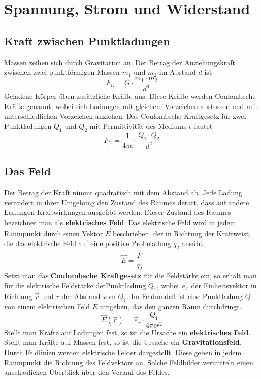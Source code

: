 \section{Spannung, Strom und Widerstand}
\subsection{Kraft zwischen Punktladungen}
Massen zeihen sich durch Gravitation an. Der Betrag der Anziehungskraft zwischen zwei punktförmigen Massen $m_1$ und $m_2$ im Abstand $d$ ist
\begin{equation}
\boxed{F_G=G\cdot \dfrac{m_1\cdot m_2}{d^3}}
\end{equation}
Geladene Körper üben zusätzliche Kräfte aus. Diese Kräfte werden Coulombsche Kräfte genannt, wobei sich Ladungen mit gleichem Vorzeichen abstossen und mit unterschiedlichen Vorzeichen anziehen.
\newline\newline
Das Coulombsche Kraftgesetz für zwei Punktladungen $Q_1$ und $Q_2$ mit Permittivität des Mediums $\epsilon$ lautet
\begin{equation}
\boxed{F_C=\dfrac{1}{4\pi \epsilon}\cdot \dfrac{Q_1\cdot Q_2}{d^2}}
\end{equation}
\subsection{Das Feld}
Der Betrag der Kraft nimmt quadratisch mit dem Abstand ab. Jede Ladung verändert in ihrer Umgebung den Zustand des Raumes derart, dass auf andere Ladungen Kraftwirkungen ausgeübt werden. Dieser Zustand des Raumes bezeichnet man als \textbf{elektrisches Feld}. Das elektrische Feld wird in jedem Raumpunkt durch einen Vektor $\overrightarrow{E}$ beschrieben, der in Richtung der Kraftweist, die das elektrische Feld auf eine positive Probeladung $q_2$ ausübt.
\begin{equation}
\boxed{\overrightarrow{E}=\dfrac{\overrightarrow{F}}{q_2}}
\end{equation}
Setzt man das \textbf{Coulombsche Kraftgesetz} für die Feldstärke ein, so erhält man für die elektrische Feldstärke derPunktladung $Q_1$, wobei $\overrightarrow{e}_r$ der Einheitsvektor in Richtung $\overrightarrow{r}$ und $r$ der Abstand vom $Q_1$. Im Feldmodell ist eine Punktladung $Q$ von einem elektrischen Feld $E$ umgeben, das den ganzen Raum durchdringt.
\begin{equation}
\boxed{\overrightarrow{E}\left(\overrightarrow{r}\right)=\overrightarrow{e}_r\cdot \dfrac{Q_1}{4\pi\epsilon r^2}}
\end{equation}
\newline\newline
Stellt man Kräfte auf Ladungen fest, so ist die Ursache ein \textbf{elektrisches Feld}. Stellt man Kräfte auf Massen fest, so ist die Ursache ein \textbf{Gravitationsfeld}.
\newline\newline
Durch Feldlinien werden elektrische Felder dargestellt. Diese geben in jedem Raumpunkt die Richtung des Feldvektors an. Solche Feldbilder vermitteln einen anschaulichen Überblick über den Verlauf des Feldes.
